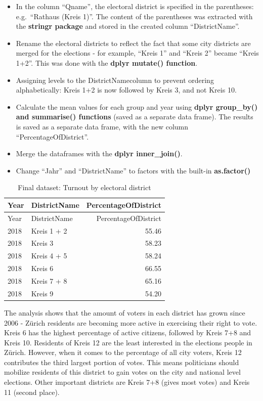 \documentclass[
]{article}
\providecommand{\tightlist}{%
  \setlength{\itemsep}{0pt}\setlength{\parskip}{0pt}}
\begin{document}
\begin{itemize}
\tightlist
\item
  In the column ``Qname'', the electoral district is specified in the
  parentheses: e.g.~``Rathaus (Kreis 1)''. The content of the
  parentheses was extracted with the \textbf{stringr package} and stored
  in the created column ``DistrictName''.
\item
  Rename the electoral districts to reflect the fact that some city
  districts are merged for the elections - for example, ``Kreis 1'' and
  ``Kreis 2'' became ``Kreis 1+2''. This was done with the \textbf{dplyr
  mutate() function}.
\item
  Assigning levels to the DistrictNamecolumn to prevent ordering
  alphabetically: Kreis 1+2 is now followed by Kreis 3, and not Kreis
  10.
\item
  Calculate the mean values for each group and year using \textbf{dplyr
  group\_by() and summarise() functions} (saved as a separate data
  frame). The results is saved as a separate data frame, with the new
  column ``PercentageOfDistrict''.
\item
  Merge the dataframes with the \textbf{dplyr inner\_join()}.
\item
  Change ``Jahr'' and ``DistrictName'' to factors with the built-in
  \textbf{as.factor()}
\end{itemize}

\begin{longtable}[]{@{}llr@{}}
\caption{Final dataset: Turnout by electoral district}\tabularnewline
\toprule
Year & DistrictName & PercentageOfDistrict\tabularnewline
\midrule
\endfirsthead
\toprule
Year & DistrictName & PercentageOfDistrict\tabularnewline
\midrule
\endhead
2018 & Kreis 1 + 2 & 55.46\tabularnewline
2018 & Kreis 3 & 58.23\tabularnewline
2018 & Kreis 4 + 5 & 58.24\tabularnewline
2018 & Kreis 6 & 66.55\tabularnewline
2018 & Kreis 7 + 8 & 65.16\tabularnewline
2018 & Kreis 9 & 54.20\tabularnewline
\bottomrule
\end{longtable}

The analysis shows that the amount of voters in each district has grown
since 2006 - Zürich residents are becoming more active in exercising
their right to vote. Kreis 6 has the highest percentage of active
citizens, followed by Kreis 7+8 and Kreis 10. Residents of Kreis 12 are
the least interested in the elections people in Zürich. However, when it
comes to the percentage of all city voters, Kreis 12 contributes the
third largest portion of votes. This means politicians should mobilize
residents of this district to gain votes on the city and national level
elections. Other important districts are Kreis 7+8 (gives most votes)
and Kreis 11 (second place).
\end{document}
